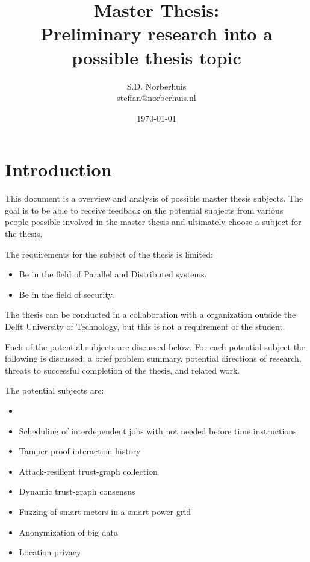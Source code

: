 \documentclass{article}
\title{Master Thesis:\\ Preliminary research into a possible thesis topic}
\author{S.D. Norberhuis\\steffan@norberhuis.nl}
\date{\today}
\begin{document}
\maketitle

\tableofcontents

\section{Introduction}
This document is a overview and analysis of possible master thesis subjects.
The goal is to be able to receive feedback on the potential subjects from various people possible involved in the master thesis
and ultimately choose a subject for the thesis.

The requirements for the subject of the thesis is limited:
\begin{itemize}
\item Be in the field of Parallel and Distributed systems.
\item Be in the field of security.
\end{itemize}
The thesis can be conducted in a collaboration with a organization outside the Delft University of Technology,
but this is not a requirement of the student. 

Each of the potential subjects are discussed below.
For each potential subject the following is discussed: 
a brief problem summary, potential directions of research, threats to successful completion of the thesis, and related work.

The potential subjects are:
\begin{itemize}
	\item 	\item Scheduling of interdependent jobs with not needed before time instructions
	\item Tamper-proof interaction history
	\item Attack-resilient trust-graph collection
	\item Dynamic trust-graph consensus
	\item Fuzzing of smart meters in a smart power grid
	\item Anonymization of big data
	\item Location privacy
\end{itemize}






\end{document}
